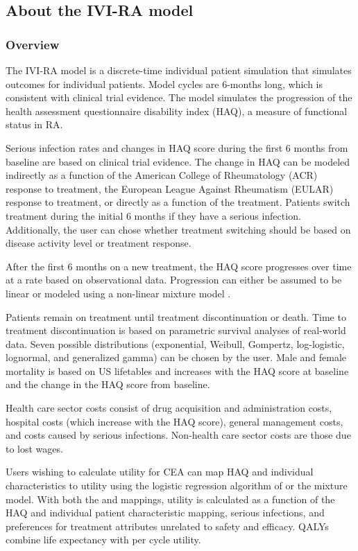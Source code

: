 \documentclass[11pt,final,fleqn]{article}\usepackage[]{graphicx}\usepackage[]{color}
\theoremstyle{plain}
\begin{document}
\subsection*{About the IVI-RA model}
\subsubsection*{Overview}
The IVI-RA model is a discrete-time individual patient simulation that simulates outcomes for individual patients. Model cycles are 6-months long, which is consistent with clinical trial evidence. The model simulates the progression of the health assessment questionnaire disability index (HAQ), a measure of functional status in RA. 

Serious infection rates and changes in HAQ score during the first 6 months from baseline are based on clinical trial evidence. The change in HAQ can be modeled indirectly as a function of the American College of Rheumatology (ACR) response to treatment, the European League Against Rheumatism (EULAR) response to treatment, or directly as a function of the treatment. Patients switch treatment during the initial 6 months if they have a serious infection. Additionally, the user can chose whether treatment switching should be based on disease activity level or treatment response. 

After the first 6 months on a new treatment, the HAQ score progresses over time at a rate based on observational data. Progression can either be assumed to be linear \citep{wolfe2010loss, michaud2011treatment} or modeled using a non-linear mixture model \citep{norton2014health}. 

Patients remain on treatment until treatment discontinuation or death. Time to treatment discontinuation is based on parametric survival analyses of real-world data. Seven possible distributions (exponential, Weibull, Gompertz, log-logistic, lognormal, and generalized gamma) can be chosen by the user. Male and female mortality is based on US lifetables and increases with the HAQ score at baseline and the change in the HAQ score from baseline. 

Health care sector costs consist of drug acquisition and administration costs, hospital costs (which increase with the HAQ score), general management costs, and costs caused by serious infections. Non-health care sector costs are those due to lost wages.

Users wishing to calculate utility for CEA can map HAQ and individual characteristics to utility using the logistic regression algorithm of \citet{wailoo2006modeling} or the \citet{alava2013relationship} mixture model. With both the \citet{wailoo2006modeling} and \citet{wailoo2006modeling} mappings, utility  is calculated as a function of the HAQ and individual patient characteristic mapping, serious infections, and preferences for treatment attributes unrelated to safety and efficacy. QALYs combine life expectancy with per cycle utility.  
\end{document}
